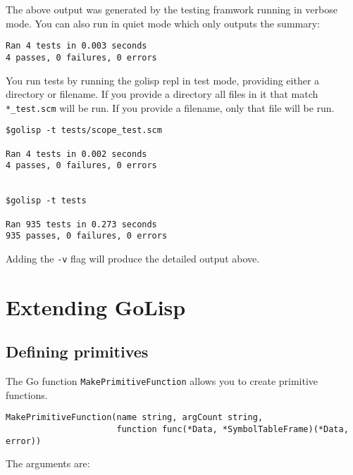 \documentclass{article}
\begin{document}
The above output was generated by the testing framwork running in verbose mode. You can also
run in quiet mode which only outputs the summary:

\begin{verbatim}
Ran 4 tests in 0.003 seconds
4 passes, 0 failures, 0 errors
\end{verbatim}

You run tests by running the golisp repl in test mode, providing either a directory or
filename. If you provide a directory all files in it that match \verb|*_test.scm| will be
run. If you provide a filename, only that file will be run.

\begin{verbatim}
$golisp -t tests/scope_test.scm

Ran 4 tests in 0.002 seconds
4 passes, 0 failures, 0 errors


$golisp -t tests

Ran 935 tests in 0.273 seconds
935 passes, 0 failures, 0 errors
\end{verbatim}

Adding the \verb|-v| flag will produce the detailed output above.

\section{Extending GoLisp}\label{sec:extending-golisp}

\subsection{Defining primitives}\label{sec:defining-primitives}

The Go function \verb|MakePrimitiveFunction| allows you to create primitive functions.

\begin{verbatim}
MakePrimitiveFunction(name string, argCount string,
                      function func(*Data, *SymbolTableFrame)(*Data, error))
\end{verbatim}

The arguments are:
\end{document}
